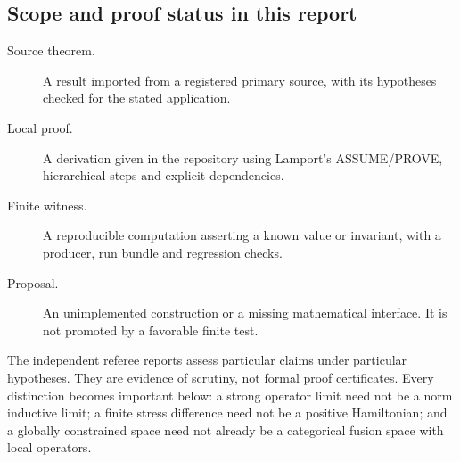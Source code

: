 
\subsection{Scope and proof status in this report}

\begin{description}
\item[Source theorem.] A result imported from a registered primary source,
with its hypotheses checked for the stated application.
\item[Local proof.] A derivation given in the repository using Lamport's
ASSUME/PROVE, hierarchical steps and explicit dependencies.
\item[Finite witness.] A reproducible computation asserting a known value
or invariant, with a producer, run bundle and regression checks.
\item[Proposal.] An unimplemented construction or a missing mathematical
interface. It is not promoted by a favorable finite test.
\end{description}

The independent referee reports assess particular claims under particular
hypotheses. They are evidence of scrutiny, not formal proof certificates.
Every distinction becomes important below: a strong operator limit need not
be a norm inductive limit; a finite stress difference need not be a positive
Hamiltonian; and a globally constrained space need not already be a
categorical fusion space with local operators.
